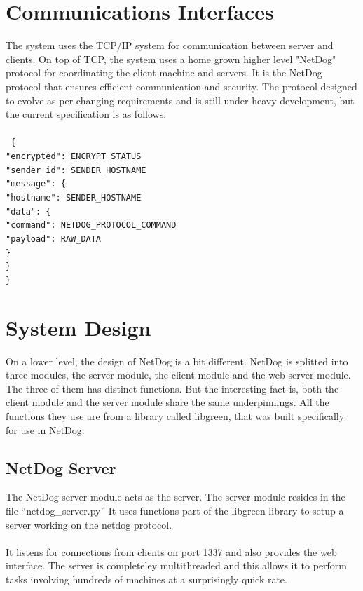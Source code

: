 \section{Communications Interfaces}
The system uses the TCP/IP system for communication between server and clients.
On top of TCP, the system uses a home grown higher level "NetDog" protocol for
coordinating the client machine and servers. It is the NetDog protocol that
ensures efficient communication and security. The protocol designed to evolve
as per changing requirements and is still under heavy development, but the
current specification is as follows.
\\\\
\texttt{
    \{\\
    \hspace*{10mm} "encrypted": ENCRYPT\_STATUS\\
    \hspace*{10mm} "sender\_id": SENDER\_HOSTNAME\\
    \hspace*{10mm} "message": \{\\
        \hspace*{20mm} "hostname": SENDER\_HOSTNAME\\
        \hspace*{20mm} "data": \{\\
            \hspace*{30mm} "command": NETDOG\_PROTOCOL\_COMMAND\\
            \hspace*{30mm} "payload": RAW\_DATA\\
        \hspace*{20mm} \}\\
    \hspace*{10mm} \}\\
    \}
}

\section{System Design}
On a lower level, the design of NetDog is a bit different. NetDog is splitted
into three modules, the server module, the client module and the web server
module. The three of them has distinct functions. But the interesting fact is,
both the client module and the server module share the same underpinnings. All
the functions they use are from a library called libgreen, that was built
specifically for use in NetDog.

\subsection{NetDog Server}
The NetDog server module acts as the server. The server module resides in the
file ``netdog\_server.py'' It uses functions part of the libgreen library to
setup a server working on the netdog protocol.
\\\\
It listens for connections from clients on port 1337 and also provides the web
interface. The server is completeley multithreaded and this allows it to
perform tasks involving hundreds of machines at a surprisingly quick rate.

